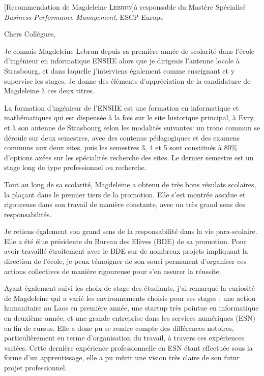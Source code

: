 \documentclass[a4paper,10pt]{article}
\begin{document}

\begin{letter}[Recommendation de Magdeleine \textsc{Lebrun}]{à}%
{responsable du Mastère Spécialisé \emph{Business Performance Management}, ESCP Europe}

Chers Collègues,

Je connais Magdeleine Lebrun depuis sa  première année de scolarité dans l'école
d'ingénieur en  informatique ENSIIE  alors que je  dirigeais l'antenne  locale à
Strasbourg,  et  dans laquelle  j'interviens  également  comme enseignant  et  y
supervise les stages.  Je donne des éléments d'appréciation de la candidature de
Magdeleine à ces deux titres.


La formation d'ingénieur de l'ENSIIE est une formation en informatique et
mathématiques qui est dispensée à la fois sur le site
historique principal, à Evry, et à son antenne de Strasbourg selon les modalités
suivantes: un tronc commun se déroule sur deux semestres, avec des contenus 
pédagogiques et des examens communs aux deux sites, puis les semestres 3, 4 et 5
sont constitués à 80\% d'options axées sur les spécialités recherche des sites.
Le dernier semestre est un stage long de type professionnel ou recherche. 

Tout  au  long de  sa  scolarité,  Magdeleine a  obtenu  de  très bons  résulats
scolaires, la plaçant dans le premier tiers de la promotion. Elle s'est montrée
assidue et rigoureuse dans son travail de manière constante, avec un très grand
sens des responsabilités. 
 

Je  retiens  également  son  grand  sens   de  la  responsabilité  dans  la  vie
para-scolaire.  Elle  a été  élue présidente  du Bureau des  Elèves (BDE)  de sa
promotion.  Pour avoir travaillé étroitement avec le BDE sur de nombreux projets
impliquant la  direction de l'école,  je peux  témoigner de son  souci permanent
d'organiser ces actions  collectives de manière rigoureuse pour  s'en assurer la
réussite.

Ayant  également suivi  les  choix  de stage  des  étudiants,  j'ai remarqué  la
curiosité de Magdeleine qui a varié les environnements choisis pour ses stages :
une action  humanitaire au Laos en  première année, une startup  très pointue en
informatique  en deuxième  année, et  une  grande entreprise  dans les  services
numériques (ESN) en fin de cursus. Elle a donc pu se rendre compte des différences
notoires, particulièrement en terme d'organisation du travail, à travers ces
expériences variées. Cette dernière expérience professionnelle en ESN étant
effectuée sous la forme d'un apprentissage, elle a pu mûrir une vision très
claire de son futur projet professionnel.



\end{letter}
\end{document}
